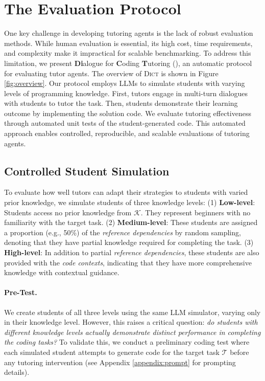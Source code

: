 \section{The \eval Evaluation Protocol}
\label{sec:evaluation}

One key challenge in developing tutoring agents is the lack of robust evaluation methods. 
While human evaluation is essential, its high cost, time requirements, and complexity make it impractical for scalable benchmarking.
To address this limitation, we present \textbf{Di}alogue for \textbf{C}oding \textbf{T}utoring (\textbf{\eval}), an automatic protocol for evaluating tutor agents. The overview of \textsc{Dict} is shown in Figure \ref{fig:overview}.
Our protocol employs LLMs to simulate students with varying levels of programming knowledge. First, tutors engage in multi-turn dialogues with students to tutor the task. Then, students demonstrate their learning outcome by implementing the solution code. We evaluate tutoring effectiveness through automated unit tests of the student-generated code. This automated approach enables controlled, reproducible, and scalable evaluations of tutoring agents.


\subsection{Controlled Student Simulation}
\label{sec:student_simulation}
To evaluate how well tutors can adapt their strategies to students with varied prior knowledge, we simulate students of three knowledge levels:
(1) \textbf{Low-level}: Students access no prior knowledge from $\mathcal{K}$. They represent beginners with no familiarity with the target task. (2) \textbf{Medium-level}: These students are assigned a proportion (e.g., 50\%) of the \textit{reference dependencies} by random sampling, denoting that they have partial knowledge required for completing the task. (3) \textbf{High-level}: In addition to partial \textit{reference dependencies}, these students are also provided with the \textit{code contexts}, indicating that they have more comprehensive knowledge with contextual guidance.

\paragraph{Pre-Test.}
\label{sec:pre_test}

We create students of all three levels using the same LLM simulator, varying only in their knowledge level. 
However, this raises a critical question: \textit{do students with different knowledge levels actually demonstrate distinct performance in completing the coding tasks?} To validate this, we conduct a preliminary coding test where each simulated student attempts to generate code for the target task $\mathcal{T}$ before any tutoring intervention (see Appendix \ref{appendix:prompt} for prompting details).

